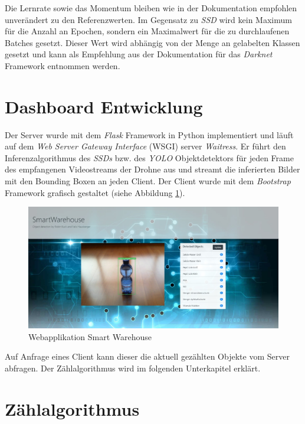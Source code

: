 Die Lernrate sowie das Momentum bleiben wie in der Dokumentation empfohlen unverändert zu den Referenzwerten. Im Gegensatz zu \textit{SSD} wird kein Maximum für die Anzahl an Epochen, sondern ein Maximalwert für die zu durchlaufenen Batches gesetzt. Dieser Wert wird abhängig von der Menge an gelabelten Klassen gesetzt und kann als Empfehlung aus der Dokumentation für das \textit{Darknet} Framework entnommen werden. 

\section{Dashboard Entwicklung}

Der Server wurde mit dem \textit{Flask} Framework in Python implementiert und läuft auf dem \textit{Web Server Gateway Interface} (WSGI) server \textit{Waitress}. Er führt den Inferenzalgorithmus des \textit{SSDs} bzw. des \textit{YOLO} Objektdetektors für jeden Frame des empfangenen Videostreams der Drohne aus und streamt die inferierten Bilder mit den Bounding Boxen an jeden Client. Der Client wurde mit dem \textit{Bootstrap} Framework grafisch gestaltet (siehe Abbildung \ref{webapp}).

\begin{figure}[H]
	\begin{center}
		\includegraphics[width=15cm]{Bilder/webapp.jpeg} 
		\caption[Webapplikation Smart Warehouse]{Webapplikation Smart Warehouse}
		\label{webapp}
	\end{center}
\end{figure}

Auf Anfrage eines Client kann dieser die aktuell gezählten Objekte vom Server abfragen. Der Zählalgorithmus wird im folgenden Unterkapitel erklärt. 

\section{Zählalgorithmus}


